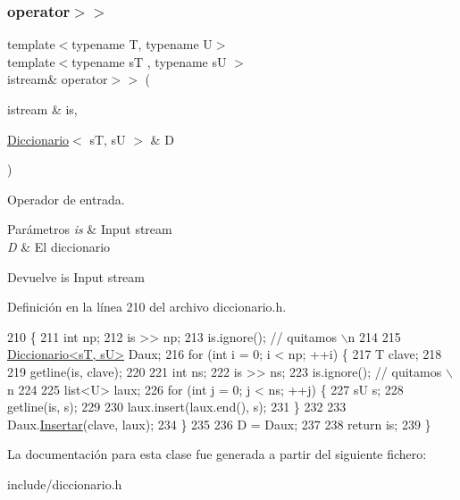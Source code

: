 \subsubsection{\texorpdfstring{operator$>$$>$}{operator>>}}
{\footnotesize\ttfamily template$<$typename T, typename U$>$ \\
template$<$typename sT , typename sU $>$ \\
istream\& operator$>$$>$ (\begin{DoxyParamCaption}\item[{istream \&}]{is,  }\item[{\hyperlink{classDiccionario}{Diccionario}$<$ sT, sU $>$ \&}]{D }\end{DoxyParamCaption})\hspace{0.3cm}{\ttfamily [friend]}}



Operador de entrada. 


\begin{DoxyParams}{Parámetros}
{\em is} & Input stream \\
\hline
{\em D} & El diccionario \\
\hline
\end{DoxyParams}
\begin{DoxyReturn}{Devuelve}
is Input stream 
\end{DoxyReturn}


Definición en la línea 210 del archivo diccionario.\+h.


\begin{DoxyCode}
210                                                                     \{        
211         \textcolor{keywordtype}{int} np;
212         is >> np;
213         is.ignore(); \textcolor{comment}{// quitamos \(\backslash\)n}
214 
215         \hyperlink{classDiccionario}{Diccionario<sT, sU>} Daux;
216         \textcolor{keywordflow}{for} (\textcolor{keywordtype}{int} i = 0; i < np; ++i) \{
217           T clave;
218 
219           getline(is, clave);
220 
221           \textcolor{keywordtype}{int} ns;
222           is >> ns;
223           is.ignore(); \textcolor{comment}{// quitamos \(\backslash\)n}
224 
225           list<U> laux;
226           \textcolor{keywordflow}{for} (\textcolor{keywordtype}{int} j = 0; j < ns; ++j) \{
227             sU s;
228             getline(is, s);
229 
230             laux.insert(laux.end(), s);
231           \}
232 
233           Daux.\hyperlink{classDiccionario_af520b73907852cc8002260ddf9fb822c}{Insertar}(clave, laux);
234         \}
235 
236         D = Daux;
237 
238         \textcolor{keywordflow}{return} is;
239     \}
\end{DoxyCode}


La documentación para esta clase fue generada a partir del siguiente fichero\+:\begin{DoxyCompactItemize}
\item 
include/diccionario.\+h\end{DoxyCompactItemize}
